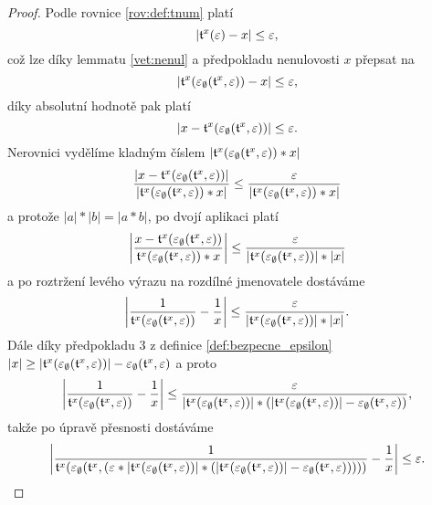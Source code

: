 \begin{theorem}
\begin{proof}
Podle rovnice \ref{rov:def:tnum} platí 
\begin{equation}
\left|\mathfrak{t}^{x}(\varepsilon)-x\right|\leq \varepsilon,
\end{equation}
což lze díky lemmatu \ref{vet:nenul} a předpokladu nenulovosti $x$ přepsat na
\begin{equation}
\left|\mathfrak{t}^{x}(\varepsilon_\emptyset(\mathfrak{t}^{x}, \varepsilon))-x\right|\leq \varepsilon,
\end{equation}
díky absolutní hodnotě pak platí
\begin{equation}
\left| x-\mathfrak{t}^{x}(\varepsilon_\emptyset(\mathfrak{t}^{x}, \varepsilon))\right|\leq \varepsilon.
\end{equation}
Nerovnici vydělíme kladným číslem $|\mathfrak{t}^{x}(\varepsilon_\emptyset(\mathfrak{t}^{x}, \varepsilon))*x|$
\begin{equation}
\frac{\left| x-\mathfrak{t}^{x}(\varepsilon_\emptyset(\mathfrak{t}^{x}, \varepsilon))\right|}{|\mathfrak{t}^{x}(\varepsilon_\emptyset(\mathfrak{t}^{x}, \varepsilon))*x|}\leq \frac{\varepsilon}{|\mathfrak{t}^{x}(\varepsilon_\emptyset(\mathfrak{t}^{x}, \varepsilon))*x|}
\end{equation}
a protože $|a|*|b|=|a*b|$, po dvojí aplikaci platí
\begin{equation}
\left|\frac{x-\mathfrak{t}^{x}(\varepsilon_\emptyset(\mathfrak{t}^{x}, \varepsilon))}{\mathfrak{t}^{x}(\varepsilon_\emptyset(\mathfrak{t}^{x}, \varepsilon))*x}\right|\leq \frac{\varepsilon}{|\mathfrak{t}^{x}(\varepsilon_\emptyset(\mathfrak{t}^{x}, \varepsilon))|*|x|}
\end{equation}
a po roztržení levého výrazu na rozdílné jmenovatele dostáváme
\begin{equation}
\left|\frac{1}{\mathfrak{t}^{x}(\varepsilon_\emptyset(\mathfrak{t}^{x}, \varepsilon))}-\frac{1}{x}\right|\leq \frac{\varepsilon}{|\mathfrak{t}^{x}(\varepsilon_\emptyset(\mathfrak{t}^{x}, \varepsilon))|*|x|}.
\end{equation}
Dále díky předpokladu $3$ z definice \ref{def:bezpecne_epsilon} $|x|\geq|\mathfrak{t}^{x}(\varepsilon_\emptyset(\mathfrak{t}^{x}, \varepsilon))|-\varepsilon_\emptyset(\mathfrak{t}^{x}, \varepsilon)$ a proto
\begin{equation}
\left|\frac{1}{\mathfrak{t}^{x}(\varepsilon_\emptyset(\mathfrak{t}^{x}, \varepsilon))}-\frac{1}{x}\right|\leq \frac{\varepsilon}{|\mathfrak{t}^{x}(\varepsilon_\emptyset(\mathfrak{t}^{x}, \varepsilon))|*(|\mathfrak{t}^{x}(\varepsilon_\emptyset(\mathfrak{t}^{x}, \varepsilon))|-\varepsilon_\emptyset(\mathfrak{t}^{x}, \varepsilon))},
\end{equation}
takže po úpravě přesnosti dostáváme
\begin{equation}
\left|\frac{1}{\mathfrak{t}^{x}(\varepsilon_\emptyset(\mathfrak{t}^{x}, (\varepsilon * |\mathfrak{t}^{x}(\varepsilon_\emptyset(\mathfrak{t}^{x}, \varepsilon))|*(|\mathfrak{t}^{x}(\varepsilon_\emptyset(\mathfrak{t}^{x}, \varepsilon))|-\varepsilon_\emptyset(\mathfrak{t}^{x}, \varepsilon)))))}-\frac{1}{x}\right|\leq \varepsilon.
\end{equation}
\end{proof}
\end{theorem}

